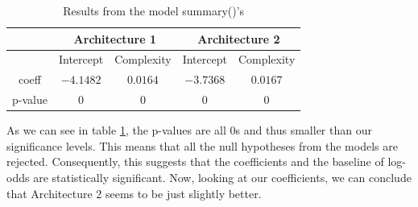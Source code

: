 \documentclass[a4paper]{article}
\begin{document}
\begin{table}[H]
    \centering
\begin{tabular}{ |c|c|c|c|c| }
\hline
\rowcolor{lightgray} \multicolumn{1}{|c|}{} & \multicolumn{2}{|c|}{Architecture 1} &
\multicolumn{2}{|c|}{Architecture 2}\\
\hline
& Intercept & Complexity & Intercept & Complexity \\
\hline
coeff & $-4.1482$ & $0.0164$ & $-3.7368$ & $0.0167$\\
\hline
p-value & 0 & 0 & 0 & 0\\ 
\hline
\end{tabular}
    \caption{Results from the model summary()'s}
    \label{tab:q2results}
\end{table}
As we can see in table \ref{tab:q2results}, the p-values are all 0s and thus smaller than our significance levels. This means that all the null hypotheses from the models are rejected. Consequently, this suggests that the coefficients and the baseline of log-odds are statistically significant. Now, looking at our coefficients, we can conclude that Architecture 2 seems to be just slightly better.
\end{document}
